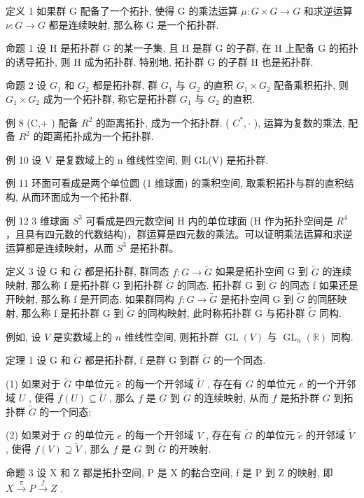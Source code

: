 \documentclass[]{article}
\begin{document}
定义 1 如果群 G 配备了一个拓扑, 使得 G 的乘法运算 $\mu: G \times G \to G$ 和求逆运算 $\nu: G \to G$ 都是连续映射, 那么称 G 是一个拓扑群. 

命题 1 设 H 是拓扑群 G 的某一子集, 且 H 是群 G 的子群, 在 H 上配备 G 的拓扑的诱导拓扑, 则 H 成为拓扑群. 特别地, 拓扑群 G 的子群 H 也是拓扑群. 

命题 2 设 $G_{1}$ 和 $G_{2}$ 都是拓扑群, 群 $G_{1}$ 与 $G_{2}$ 的直积 $G_{1} \times G_{2}$ 配备乘积拓扑, 则 $G_{1} \times G_{2}$ 成为一个拓扑群, 称它是拓扑群 $G_{1}$ 与 $G_{2}$ 的直积. 

例 8 (C,+ ) 配备 $R^{2}$ 的距离拓扑, 成为一个拓扑群. ( $C^{*},\cdot$ ), 运算为复数的乘法, 配备 $R^{2}$ 的距离拓扑成为一个拓扑群. 

例 10 设 V 是复数域上的 n 维线性空间, 则 GL(V) 是拓扑群. 

例 11 环面可看成是两个单位圆 (1 维球面) 的乘积空间, 取乘积拓扑与群的直积结构, 从而环面成为一个拓扑群. 

例 12 3 维球面 $S^{3}$ 可看成是四元数空间 H 内的单位球面 (H 作为拓扑空间是 $R^{4}$ ，且具有四元数的代数结构)，群运算是四元数的乘法。可以证明乘法运算和求逆运算都是连续映射，从而 $S^{3}$ 是拓扑群。 

定义 3 设 G 和 $\widetilde{G}$ 都是拓扑群, 群同态 $f: G \to \widetilde{G}$ 如果是拓扑空间 G 到 $\widetilde{G}$ 的连续映射, 那么称 f 是拓扑群 G 到拓扑群 $\widetilde{G}$ 的同态. 拓扑群 G 到 $\widetilde{G}$ 的同态 f 如果还是开映射, 那么称 f 是开同态. 如果群同构 $f: G \to \widetilde{G}$ 是拓扑空间 G 到 $\widetilde{G}$ 的同胚映射, 那么称 f 是拓扑群 G 到 $\widetilde{G}$ 的同构映射, 此时称拓扑群 G 与拓扑群 $\widetilde{G}$ 同构. 

例如, 设 $V$ 是实数域上的 $n$ 维线性空间, 则拓扑群 $\operatorname{GL}(V)$ 与 $\operatorname{GL}_n(\mathbb{R})$ 同构. 

定理 1 设 G 和 $\tilde{G}$ 都是拓扑群, f 是群 G 到群 $\tilde{G}$ 的一个同态. 

(1) 如果对于 $\widetilde{G}$ 中单位元 $\widetilde{e}$ 的每一个开邻域 $\widetilde{U}$ , 存在有 $G$ 的单位元 $e$ 的一个开邻域 $U$ , 使得 $f(U) \subseteq \widetilde{U}$ , 那么 $f$ 是 $G$ 到 $\widetilde{G}$ 的连续映射, 从而 $f$ 是拓扑群 $G$ 到拓扑群 $\widetilde{G}$ 的一个同态; 

(2) 如果对于 $G$ 的单位元 $e$ 的每一个开邻域 $V$ , 存在有 $\widetilde{G}$ 的单位元 $\widetilde{e}$ 的开邻域 $\widetilde{V}$ , 使得 $f(V) \supseteq \widetilde{V}$ , 那么 $f$ 是 $G$ 到 $\widetilde{G}$ 的开映射. 

命题 3 设 X 和 Z 都是拓扑空间, P 是 X 的黏合空间, f 是 P 到 Z 的映射, 即 $X \xrightarrow{\pi} P \xrightarrow{f} Z$ . 
\end{document}
